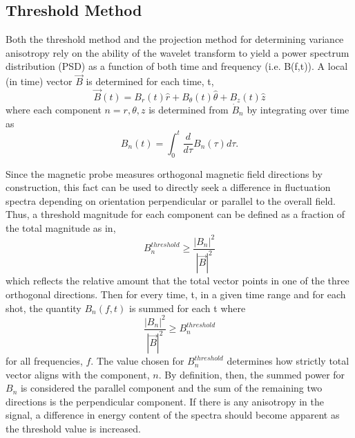 \documentclass[aip,prl,amsmath,amssymb,reprint,superscriptaddress]{revtex4-1} %
\begin{document}
\subsection{Threshold Method}

Both the threshold method and the projection method for determining variance anisotropy rely on the ability of the wavelet transform to yield a power spectrum distribution (PSD) as a function of both time and frequency (i.e. B(f,t)). A local (in time) vector $\vec{B}$ is determined for each time, t,
\begin{equation}
\vec{B}(t) = B_{r}(t)\hat{r} + B_{\theta}(t)\hat{\theta} + B_{z}(t)\hat{z}
\label{eq:Bvector}
\end{equation}
where each component $n=r,\theta,z$ is determined from $\dot{B}_{n}$ by integrating over time as
\begin{equation}
B_{n}(t) = \int_{0}^{t} \frac{d}{d\tau}B_{n}(\tau)d\tau.
\label{eq:Bintegrated}
\end{equation}

Since the magnetic probe measures orthogonal magnetic field directions by construction, this fact can be used to directly seek a difference in fluctuation spectra depending on orientation perpendicular or parallel to the overall field. Thus, a threshold magnitude for each component can be defined as a fraction of the total magnitude as in,
\begin{equation}
B_{n}^{threshold} \geq \frac{|B_{n}|^{2}}{|\vec{B}|^{2}}
\label{eq:Bthreshold}
\end{equation}
which reflects the relative amount that the total vector points in one of the three orthogonal directions. Then for every time, t, in a given time range and for each shot, the quantity $B_{n}(f,t)$ is summed for each t where
\begin{equation}
\frac{|B_{n}|^{2}}{|\vec{B}|^{2}} \geq B_{n}^{threshold}
\label{eq:Bcondition}
\end{equation}
for all frequencies, $f$. The value chosen for $B_{n}^{threshold}$ determines how strictly total vector aligns with the component, $n$. By definition, then, the summed power for $B_{n}$ is considered the parallel component and the sum of the remaining two directions is the perpendicular component. If there is any anisotropy in the signal, a difference in energy content of the spectra should become apparent as the threshold value is increased.
\end{document}
